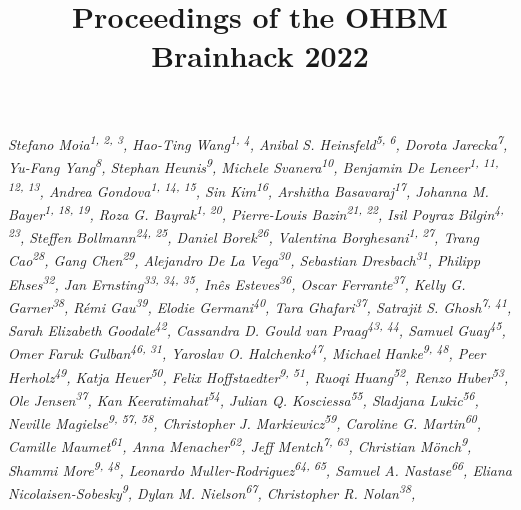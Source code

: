 \documentclass[10pt,a4paper,twocolumns]{proc}
\title{Proceedings of the OHBM Brainhack 2022}
\newcommand{\authors}[1]{\emph{\footnotesize #1} \\}
\begin{document}
\maketitle

\authors{Stefano Moia\textsuperscript{1, 2, 3}, %
Hao-Ting Wang\textsuperscript{1, 4}, %
Anibal S. Heinsfeld\textsuperscript{5, 6}, %
Dorota Jarecka\textsuperscript{7}, %
Yu-Fang Yang\textsuperscript{8}, %
Stephan Heunis\textsuperscript{9}, %
Michele Svanera\textsuperscript{10}, %
Benjamin De Leneer\textsuperscript{1, 11, 12, 13}, %
Andrea Gondova\textsuperscript{1, 14, 15}, %
Sin Kim\textsuperscript{16}, %
Arshitha Basavaraj\textsuperscript{17}, %
Johanna M. Bayer\textsuperscript{1, 18, 19}, %
Roza G. Bayrak\textsuperscript{1, 20}, %
Pierre-Louis Bazin\textsuperscript{21, 22}, %
Isil Poyraz Bilgin\textsuperscript{4, 23}, %
Steffen Bollmann\textsuperscript{24, 25}, %
Daniel Borek\textsuperscript{26}, %
Valentina Borghesani\textsuperscript{1, 27}, %
Trang Cao\textsuperscript{28}, %
Gang Chen\textsuperscript{29}, %
Alejandro De La Vega\textsuperscript{30}, %
Sebastian Dresbach\textsuperscript{31}, %
Philipp Ehses\textsuperscript{32}, %
Jan Ernsting\textsuperscript{33, 34, 35}, %
Inês Esteves\textsuperscript{36}, %
Oscar Ferrante\textsuperscript{37}, %
Kelly G. Garner\textsuperscript{38}, %
Rémi Gau\textsuperscript{39}, %
Elodie Germani\textsuperscript{40}, %
Tara Ghafari\textsuperscript{37}, %
Satrajit S. Ghosh\textsuperscript{7, 41}, %
Sarah Elizabeth Goodale\textsuperscript{42}, %
Cassandra D. Gould van Praag\textsuperscript{43, 44}, %
Samuel Guay\textsuperscript{45}, %
Omer Faruk Gulban\textsuperscript{46, 31}, %
Yaroslav O. Halchenko\textsuperscript{47}, %
Michael Hanke\textsuperscript{9, 48}, %
Peer Herholz\textsuperscript{49}, %
Katja Heuer\textsuperscript{50}, %
Felix Hoffstaedter\textsuperscript{9, 51}, %
Ruoqi Huang\textsuperscript{52}, %
Renzo Huber\textsuperscript{53}, %
Ole Jensen\textsuperscript{37}, %
Kan Keeratimahat\textsuperscript{54}, %
Julian Q. Kosciessa\textsuperscript{55}, %
Sladjana Lukic\textsuperscript{56}, %
Neville Magielse\textsuperscript{9, 57, 58}, %
Christopher J. Markiewicz\textsuperscript{59}, %
Caroline G. Martin\textsuperscript{60}, %
Camille Maumet\textsuperscript{61}, %
Anna Menacher\textsuperscript{62}, %
Jeff Mentch\textsuperscript{7, 63}, %
Christian Mönch\textsuperscript{9}, %
Shammi More\textsuperscript{9, 48}, %
Leonardo Muller-Rodriguez\textsuperscript{64, 65}, %
Samuel A. Nastase\textsuperscript{66}, %
Eliana Nicolaisen-Sobesky\textsuperscript{9}, %
Dylan M. Nielson\textsuperscript{67}, %
Christopher R. Nolan\textsuperscript{38}, %
}
\end{document}
